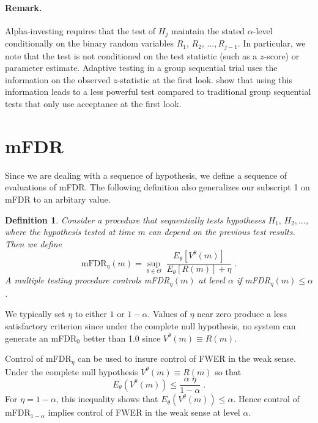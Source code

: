 \documentclass[12pt]{article}
\newtheorem{definition}{Definition}
\begin{document}
\paragraph{Remark.}  
Alpha-investing requires that the test of $H_j$ maintain the
stated $\alpha$-level conditionally on the binary random variables $R_1$,
$R_2, \,\ldots, R_{j-1}$.  In particular, we note that the test is not
conditioned on the test statistic (such as a $z$-score) or parameter
estimate.  Adaptive testing in a group sequential trial
\citep[e.g.][]{lehmacher99} uses the information on the observed
$z$-statistic at the first look.  \cite{tsiatis03} show that using
this information leads to a less powerful test compared to traditional
group sequential tests that only use acceptance at the first
look.

\section{mFDR}   \label{sec:mFDR}                          %

Since we are dealing with a sequence of hypothesis, we define a sequence of evaluations of mFDR.  The following definition also generalizes our subscript 1 on mFDR to an arbitary value.  
\begin{definition} Consider a procedure that sequentially tests
 hypotheses $H_{1},\, H_{2},\ldots$, where the hypothesis
 tested at time $m$ can depend on the previous test results.  Then we define
\begin{equation}
  \mbox{mFDR}_{\eta}(m) 
   = \sup_{\theta \in \Theta} \;
\frac{E_\theta[V^\theta(m)]}{E_\theta[R(m)] + \eta}  \;.
\label{eq:def:mFDR}
\end{equation}
A multiple testing procedure {\em controls mFDR${}_{\eta}(m)$ at level $\alpha$} if
 mFDR$_{\eta}(m) \le \alpha$.
\end{definition}
We typically set $\eta$ to either $1$ or  $1-\alpha$.  Values of $\eta$ near zero produce a less satisfactory criterion since under the complete null hypothesis,
no system can generate an mFDR${}_{0}$ better than 1.0 since $V^{\theta}(m) \equiv R(m)$.  

Control of mFDR${}_\eta$ can be used to insure control of FWER
 in the weak sense.  Under the complete null hypothesis
 $V^\theta(m) \equiv R(m)$ so that 
\begin{displaymath}
   E_\theta(V^\theta(m)) \le \frac{\alpha\;\eta}{1 - \alpha} \;.
\end{displaymath}
For $\eta = 1-\alpha$, this inequality shows that 
 $E_\theta(V^\theta(m)) \le \alpha$.  Hence control of mFDR$_{1-\alpha}$ implies control of FWER in the weak sense at level $\alpha$.
\end{document}
